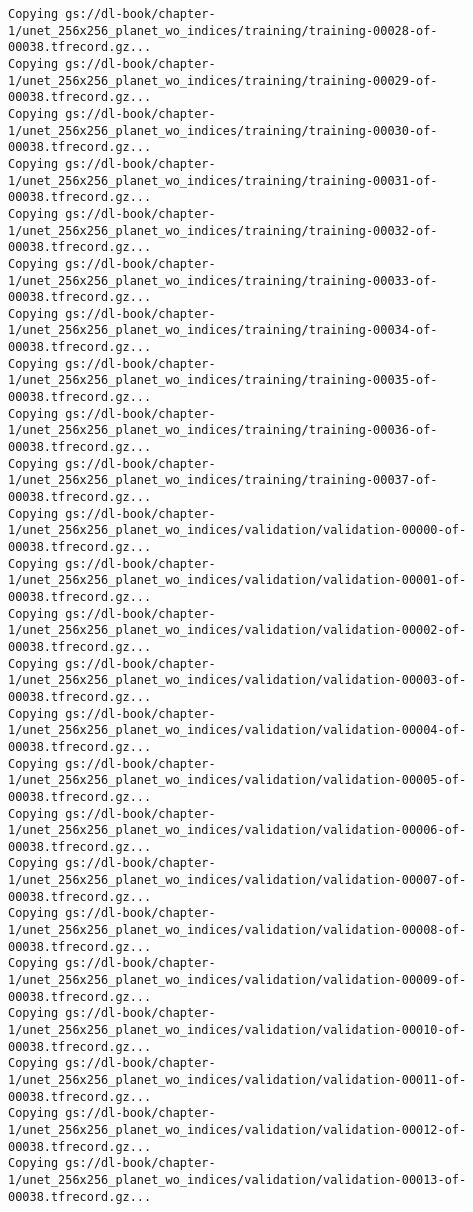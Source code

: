 \documentclass[
  letterpaper,
  DIV=11,
  numbers=noendperiod]{scrreprt}
\begin{document}
\begin{verbatim}
Copying gs://dl-book/chapter-1/unet_256x256_planet_wo_indices/training/training-00028-of-00038.tfrecord.gz...
Copying gs://dl-book/chapter-1/unet_256x256_planet_wo_indices/training/training-00029-of-00038.tfrecord.gz...
Copying gs://dl-book/chapter-1/unet_256x256_planet_wo_indices/training/training-00030-of-00038.tfrecord.gz...
Copying gs://dl-book/chapter-1/unet_256x256_planet_wo_indices/training/training-00031-of-00038.tfrecord.gz...
Copying gs://dl-book/chapter-1/unet_256x256_planet_wo_indices/training/training-00032-of-00038.tfrecord.gz...
Copying gs://dl-book/chapter-1/unet_256x256_planet_wo_indices/training/training-00033-of-00038.tfrecord.gz...
Copying gs://dl-book/chapter-1/unet_256x256_planet_wo_indices/training/training-00034-of-00038.tfrecord.gz...
Copying gs://dl-book/chapter-1/unet_256x256_planet_wo_indices/training/training-00035-of-00038.tfrecord.gz...
Copying gs://dl-book/chapter-1/unet_256x256_planet_wo_indices/training/training-00036-of-00038.tfrecord.gz...
Copying gs://dl-book/chapter-1/unet_256x256_planet_wo_indices/training/training-00037-of-00038.tfrecord.gz...
Copying gs://dl-book/chapter-1/unet_256x256_planet_wo_indices/validation/validation-00000-of-00038.tfrecord.gz...
Copying gs://dl-book/chapter-1/unet_256x256_planet_wo_indices/validation/validation-00001-of-00038.tfrecord.gz...
Copying gs://dl-book/chapter-1/unet_256x256_planet_wo_indices/validation/validation-00002-of-00038.tfrecord.gz...
Copying gs://dl-book/chapter-1/unet_256x256_planet_wo_indices/validation/validation-00003-of-00038.tfrecord.gz...
Copying gs://dl-book/chapter-1/unet_256x256_planet_wo_indices/validation/validation-00004-of-00038.tfrecord.gz...
Copying gs://dl-book/chapter-1/unet_256x256_planet_wo_indices/validation/validation-00005-of-00038.tfrecord.gz...
Copying gs://dl-book/chapter-1/unet_256x256_planet_wo_indices/validation/validation-00006-of-00038.tfrecord.gz...
Copying gs://dl-book/chapter-1/unet_256x256_planet_wo_indices/validation/validation-00007-of-00038.tfrecord.gz...
Copying gs://dl-book/chapter-1/unet_256x256_planet_wo_indices/validation/validation-00008-of-00038.tfrecord.gz...
Copying gs://dl-book/chapter-1/unet_256x256_planet_wo_indices/validation/validation-00009-of-00038.tfrecord.gz...
Copying gs://dl-book/chapter-1/unet_256x256_planet_wo_indices/validation/validation-00010-of-00038.tfrecord.gz...
Copying gs://dl-book/chapter-1/unet_256x256_planet_wo_indices/validation/validation-00011-of-00038.tfrecord.gz...
Copying gs://dl-book/chapter-1/unet_256x256_planet_wo_indices/validation/validation-00012-of-00038.tfrecord.gz...
Copying gs://dl-book/chapter-1/unet_256x256_planet_wo_indices/validation/validation-00013-of-00038.tfrecord.gz...

\end{verbatim}
\end{document}
